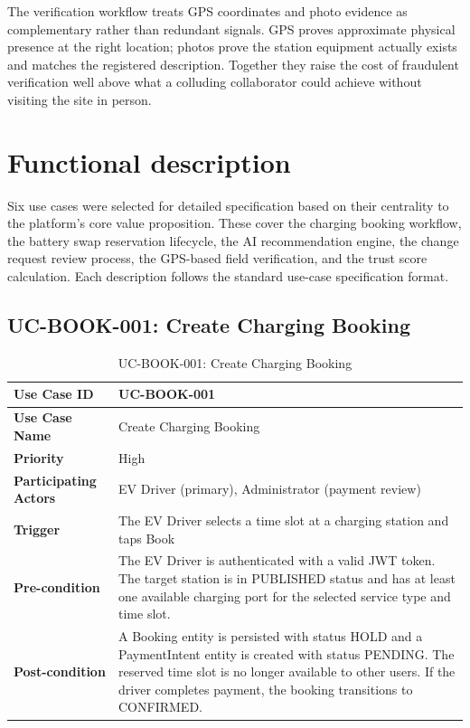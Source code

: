 \documentclass[../Main.tex]{subfiles}
\begin{document}
The verification workflow treats GPS coordinates and photo evidence as complementary rather than redundant signals. GPS proves approximate physical presence at the right location; photos prove the station equipment actually exists and matches the registered description. Together they raise the cost of fraudulent verification well above what a colluding collaborator could achieve without visiting the site in person.
\section{Functional description}
\label{section:2.3}
Six use cases were selected for detailed specification based on their centrality to the platform's core value proposition. These cover the charging booking workflow, the battery swap reservation lifecycle, the AI recommendation engine, the change request review process, the GPS-based field verification, and the trust score calculation. Each description follows the standard use-case specification format.

\subsection{UC-BOOK-001: Create Charging Booking}
\label{subsection:2.3.1}

\begin{table}[H]
\caption{UC-BOOK-001: Create Charging Booking}
\label{table:uc-book-001}
\begin{tabular}{|p{3.5cm}|p{12cm}|}
\hline
\textbf{Use Case ID} & UC-BOOK-001 \\ \hline
\textbf{Use Case Name} & Create Charging Booking \\ \hline
\textbf{Priority} & High \\ \hline
\textbf{Participating Actors} & EV Driver (primary), Administrator (payment review) \\ \hline
\textbf{Trigger} & The EV Driver selects a time slot at a charging station and taps Book \\ \hline
\textbf{Pre-condition} & The EV Driver is authenticated with a valid JWT token. The target station is in PUBLISHED status and has at least one available charging port for the selected service type and time slot. \\ \hline
\textbf{Post-condition} & A Booking entity is persisted with status HOLD and a PaymentIntent entity is created with status PENDING. The reserved time slot is no longer available to other users. If the driver completes payment, the booking transitions to CONFIRMED. \\ \hline
\end{tabular}
\end{table}
\end{document}
